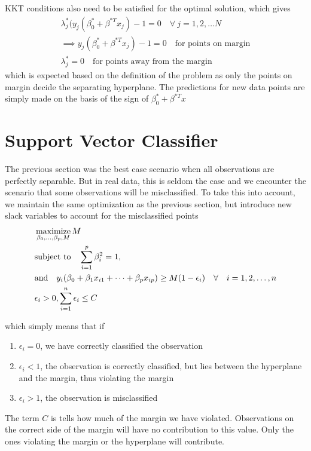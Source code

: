 \documentclass[../statistical_learning_notes.tex]{subfiles}
\begin{document}
    KKT conditions also need to be satisfied for the optimal solution, which gives
    \begin{gather*}
        \lambda_{j}^{*} (y_{j}(\beta_{0}^{*} + \beta^{*T}x_{j}) - 1 = 0 \quad \forall \: j = 1, 2, \ldots N\\
        \implies y_{j}(\beta_{0}^{*} + \beta^{*T}x_{j}) - 1 = 0 \quad \text{for points on margin}\\
        \lambda_{j}^{*} = 0 \quad \text{for points away from the margin}
    \end{gather*}
    which is expected based on the definition of the problem as only the points on margin decide the separating hyperplane. The predictions for new data points are simply made on the basis of the sign of $\beta_{0}^{*} + \beta^{*T}x$


    \section{Support Vector Classifier}
    The previous section was the best case scenario when all observations are perfectly separable. But in real data, this is seldom the case and we encounter the scenario that some observations will be misclassified. To take this into account, we maintain the same optimization as the previous section, but introduce new slack variables to account for the misclassified points
    \begin{align*}
        &\operatorname*{maximize}_{\beta_{0},\ldots,\beta_{p}, M} M\\
        &\text{subject to} \quad \sum_{i=1}^{p} \beta_{i}^{2} = 1,\\
        &\text{and} \quad y_{i}(\beta_{0} + \beta_{1}x_{i1} + \cdots + \beta_{p}x_{ip}) \geq M(1-\epsilon_{i}) \quad \forall \quad i = 1, 2, \ldots, n\\
        &\epsilon_{i} > 0, \sum_{i=1}^{n}\epsilon_{i} \leq C
    \end{align*}

    which simply means that if
    \begin{enumerate}
        \item $\epsilon_{i} = 0$, we have correctly classified the observation
        \item $\epsilon_{i} < 1$, the observation is correctly classified, but lies between the hyperplane and the margin, thus violating the margin
        \item $\epsilon_{i} > 1$, the observation is misclassified
    \end{enumerate}
    The term $C$ is tells how much of the margin we have violated. Observations on the correct side of the margin will have no contribution to this value. Only the ones violating the margin or the hyperplane will contribute.\newline
\end{document}
